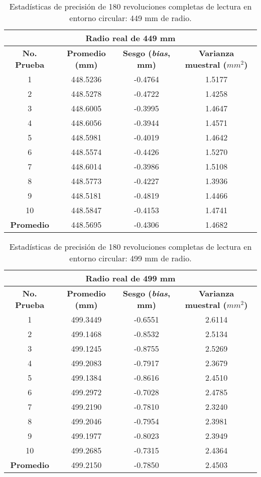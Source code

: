 \begin{table}[H]
	\centering
	\begin{tabular}{|c|c|c|c|}
		\hline
		\multicolumn{4}{|c|}{\textbf{Radio real de 449 mm}} \\ \hline
		\textbf{No. Prueba} & \textbf{Promedio (mm)} & \textbf{Sesgo (\textit{bias}, mm)} & \textbf{Varianza muestral ($mm^2$)} \\ \hline
		1 & 448.5236 & -0.4764 & 1.5177 \\ 
		2 & 448.5278 & -0.4722 & 1.4258 \\ 
		3 & 448.6005 & -0.3995 & 1.4647 \\ 
		4 & 448.6056 & -0.3944 & 1.4571 \\ 
		5 & 448.5981 & -0.4019 & 1.4642 \\ 
		6 & 448.5574 & -0.4426 & 1.5270 \\ 
		7 & 448.6014 & -0.3986 & 1.5108 \\ 
		8 & 448.5773 & -0.4227 & 1.3936 \\ 
		9 & 448.5181 & -0.4819 & 1.4466 \\
		10 & 448.5847 & -0.4153 & 1.4741 \\ \hline
		\textbf{Promedio} & 448.5695 & -0.4306 & 1.4682 \\ \hline
	\end{tabular}
	\caption{Estadísticas de precisión de 180 revoluciones completas de lectura en entorno circular: 449 mm de radio.}
	\label{fig:tabla_dists7}
\end{table}

\begin{table}[H]
	\centering
	\begin{tabular}{|c|c|c|c|}
		\hline
		\multicolumn{4}{|c|}{\textbf{Radio real de 499 mm}} \\ \hline
		\textbf{No. Prueba} & \textbf{Promedio (mm)} & \textbf{Sesgo (\textit{bias}, mm)} & \textbf{Varianza muestral ($mm^2$)} \\ \hline
		1 & 499.3449 & -0.6551 & 2.6114 \\ 
		2 & 499.1468 & -0.8532 & 2.5134 \\ 
		3 & 499.1245 & -0.8755 & 2.5269 \\ 
		4 & 499.2083 & -0.7917 & 2.3679 \\ 
		5 & 499.1384 & -0.8616 & 2.4510 \\ 
		6 & 499.2972 & -0.7028 & 2.4785 \\ 
		7 & 499.2190 & -0.7810 & 2.3240 \\ 
		8 & 499.2046 & -0.7954 & 2.3981 \\ 
		9 & 499.1977 & -0.8023 & 2.3949 \\ 
		10 & 499.2685 & -0.7315 & 2.4364 \\ \hline
		\textbf{Promedio} & 499.2150 & -0.7850 & 2.4503 \\ \hline
	\end{tabular}
	\caption{Estadísticas de precisión de 180 revoluciones completas de lectura en entorno circular: 499 mm de radio.}
	\label{fig:tabla_dists8}
\end{table}


